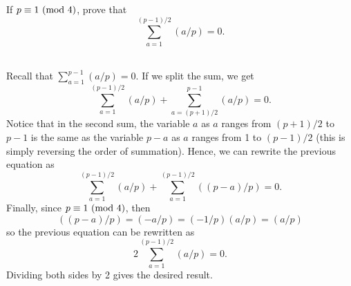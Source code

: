 \begin{exercise}
    If $p \equiv 1 \ (\mathrm{mod}\ 4)$, prove that
    $$\sum_{a=1}^{(p-1)/2}(a/p) = 0.$$
     \\
\end{exercise}

\begin{solution}
    Recall that $\sum_{a=1}^{p-1}(a/p) = 0$. If we split the sum, we get 
    $$\sum_{a=1}^{(p-1)/2}(a/p) + \sum_{a=(p+1)/2}^{p-1}(a/p) = 0.$$
    Notice that in the second sum, the variable $a$ as $a$ ranges from $(p+1)/2$ to $p-1$ is the same as the variable $p-a$ as $a$ ranges from 1 to $(p-1)/2$ (this is simply reversing the order of summation). Hence, we can rewrite the previous equation as 
    $$\sum_{a=1}^{(p-1)/2}(a/p) + \sum_{a=1}^{(p-1)/2}((p-a)/p) = 0.$$
    Finally, since $p \equiv 1 \ (\mathrm{mod}\ 4)$, then
    $$((p-a)/p) = (-a/p) = (-1/p)(a/p) = (a/p)$$
    so the previous equation can be rewritten as
    $$2\sum_{a=1}^{(p-1)/2}(a/p) = 0.$$
    Dividing both sides by 2 gives the desired result.
\end{solution}